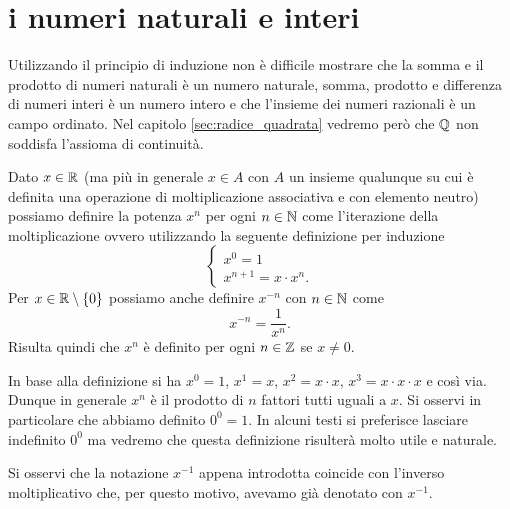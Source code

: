 \section{i numeri naturali e interi}

Utilizzando il principio di induzione non è difficile mostrare che
la somma e il prodotto di numeri naturali è un numero naturale,
somma, prodotto e differenza
di numeri interi è un numero intero e che l'insieme dei numeri
razionali è un campo ordinato.
Nel capitolo \ref{sec:radice_quadrata}
vedremo però che $\mathbb Q$ non soddisfa l'assioma di continuità.

\begin{definition}
\label{def:potenza_intera}%
%
Dato $x \in \mathbb R$ (ma più in generale $x\in A$ con $A$ un insieme qualunque su
cui è definita una operazione di moltiplicazione associativa e con elemento
neutro) possiamo definire la potenza $x^n$ per ogni
$n\in \mathbb N$ come l'iterazione della moltiplicazione
ovvero utilizzando
la seguente definizione per induzione
\[
\begin{cases}
  x^0 = 1\\
  x^{n+1} = x\cdot x^n.
\end{cases}
\]
Per $x\in \mathbb R\setminus{\left\{ 0 \right\}}$ possiamo anche definire $x^{-n}$ con $n\in \mathbb N$
come
\[
x^{-n} = \frac{1}{x^n}.
\]
Risulta quindi che $x^n$ è definito per ogni $n\in \mathbb Z$ se $x\neq 0$.
\end{definition}

In base alla definizione si ha $x^0 = 1$, $x^1=x$, $x^2=x\cdot x$,
$x^3=x\cdot x \cdot x$ e così via. Dunque in generale
$x^n$ è il prodotto di $n$ fattori tutti uguali a $x$.
Si osservi in particolare che abbiamo definito $0^0=1$.
In alcuni testi si preferisce lasciare indefinito $0^0$
ma vedremo che questa definizione risulterà
molto utile e naturale.

Si osservi che la notazione
$x^{-1}$ appena introdotta coincide
con l'inverso moltiplicativo che, per questo motivo, avevamo già denotato
con $x^{-1}$.

